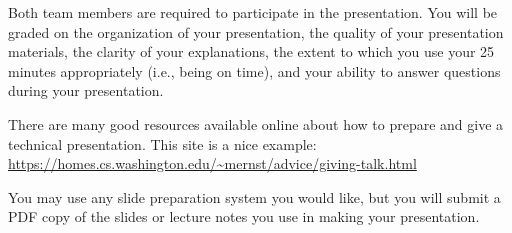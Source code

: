 \documentclass[12pt,letterpaper]{article}
\begin{document}
Both team members are required to participate in the presentation.
You will be graded on the organization of your presentation,
the quality of your presentation materials,
the clarity of your explanations,
the extent to which you use your 25 minutes appropriately (i.e., being
on time),
and your ability to answer questions during your presentation. 

There are many good resources available online about how to prepare
and give a technical presentation.  This site is a nice example:
\url{https://homes.cs.washington.edu/~mernst/advice/giving-talk.html}

You may use any slide preparation system you would like, but you 
will submit a PDF copy of the slides or lecture notes you use 
in making your presentation.
\end{document}
